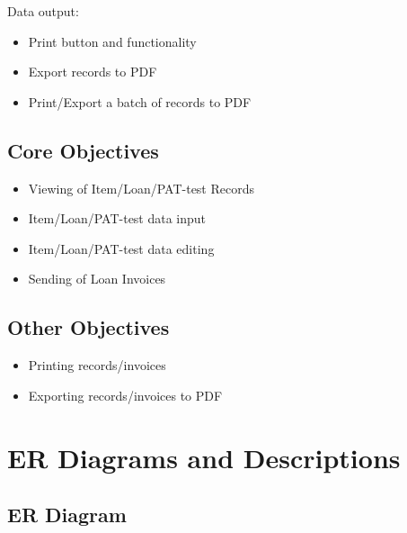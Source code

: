 \documentclass[a4paper,12pt]{report}
\begin{document}
\noindent Data output:
\begin{itemize}
    \item Print button and functionality
    \item Export records to PDF
    \item Print/Export a batch of records to PDF
\end{itemize}


\subsection{Core Objectives}

\begin{itemize}
    \item Viewing of Item/Loan/PAT-test Records
    \item Item/Loan/PAT-test data input
    \item Item/Loan/PAT-test data editing
    \item Sending of Loan Invoices
\end{itemize}

\subsection{Other Objectives}

\begin{itemize}
    \item Printing records/invoices
    \item Exporting records/invoices to PDF
\end{itemize}

\section{ER Diagrams and Descriptions}

\subsection{ER Diagram}
\end{document}
